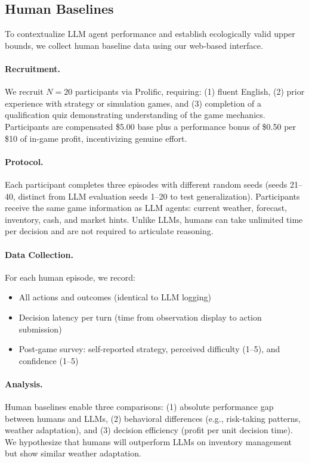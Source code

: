 \subsection{Human Baselines}
\label{sec:human-baselines}

To contextualize LLM agent performance and establish ecologically valid upper bounds, we collect human baseline data using our web-based interface.

\paragraph{Recruitment.}
We recruit $N=20$ participants via Prolific, requiring: (1) fluent English, (2) prior experience with strategy or simulation games, and (3) completion of a qualification quiz demonstrating understanding of the game mechanics. Participants are compensated \$5.00 base plus a performance bonus of \$0.50 per \$10 of in-game profit, incentivizing genuine effort.

\paragraph{Protocol.}
Each participant completes three episodes with different random seeds (seeds 21--40, distinct from LLM evaluation seeds 1--20 to test generalization). Participants receive the same game information as LLM agents: current weather, forecast, inventory, cash, and market hints. Unlike LLMs, humans can take unlimited time per decision and are not required to articulate reasoning.

\paragraph{Data Collection.}
For each human episode, we record:
\begin{itemize}
    \item All actions and outcomes (identical to LLM logging)
    \item Decision latency per turn (time from observation display to action submission)
    \item Post-game survey: self-reported strategy, perceived difficulty (1--5), and confidence (1--5)
\end{itemize}

\paragraph{Analysis.}
Human baselines enable three comparisons: (1) absolute performance gap between humans and LLMs, (2) behavioral differences (e.g., risk-taking patterns, weather adaptation), and (3) decision efficiency (profit per unit decision time). We hypothesize that humans will outperform LLMs on inventory management but show similar weather adaptation.

